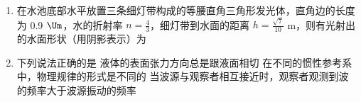\documentclass[\gkver]{gaokaozhenti}
\begin{document}
\begin{enumerate}
{

剪断细线，小球做匀加速直线运动，如图所示

根据几何关系可得 $L_{MC} = d$tan60${^\circ}$ = 10$\sqrt 3 $ $\Ucm$

故 A 错误；

B．根据几何关系可得小球沿着电场力方向的位移 $x$ = (10 - 5sin30${^\circ}$)cm = 7.5 $\Ucm$

与电场力方向相反，电场力做功为

$W_{\text{电}} = -qEx = - \frac{3}{4}\sqrt 3 \times$10$^{-4}$ J

则小球的电势能增加 $\frac{3}{4}\sqrt 3 \times$10$^{-4}$ J，故 B 正确；

C．电场强度的大小 $E = \frac{{qE}}{q} = \sqrt 3 \times$10$^{5}$ $\UNC$。故 C 错误；

D．减小 $R$ 的阻值，极板间的电势差不变，极板间的电场强度不变，所以小球的运动不会发生改变，MC 的距离不变，故 D 错误。

故选 B。
}

\item
在水池底部水平放置三条细灯带构成的等腰直角三角形发光体，直角边的长度为 0.9 $\Um$，水的折射率 $n = \frac{4}{3}$，细灯带到水面的距离 $h = \frac{{\sqrt 7 }}{{10}}$ m，则有光射出的水面形状（用阴影表示）为
\onepicture[w=13.56cm]{}

\item
下列说法正确的是
{液体的表面张力方向总是跟液面相切}
{在不同的惯性参考系中，物理规律的形式是不同的}
{当波源与观察者相互接近时，观察者观测到波的频率大于波源振动的频率}
\end{enumerate}
\end{document}
